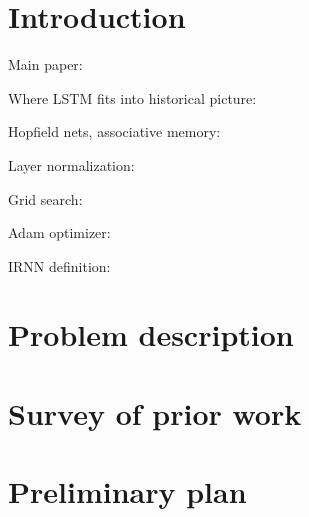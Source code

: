 \section{Introduction}

Main paper: \cite{NIPS2016_6057}

Where LSTM fits into historical picture: \cite{Schmidhuber201585}

Hopfield nets, associative memory: \cite{Mackay03informationtheory}

Layer normalization: \cite{1607.06450}

Grid search: \cite{Goodfellow-et-al-2016}

Adam optimizer: \cite{1412.6980}

IRNN definition: \cite{1511.03771}

\section{Problem description}
\section{Survey of prior work}
\section{Preliminary plan}

